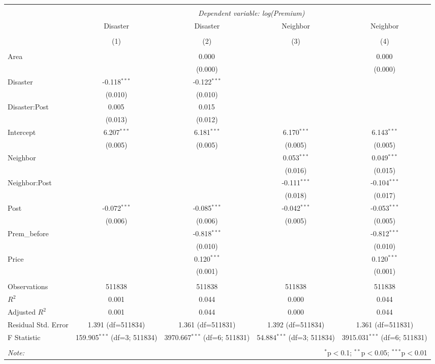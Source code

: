 
\begin{tabular}{@{\extracolsep{5pt}}lcccc}
\\[-1.8ex]\hline
\hline \\[-1.8ex]
& \multicolumn{4}{c}{\textit{Dependent variable: log(Premium)}} \
\cr \cline{2-5}
\\[-1.8ex] & \multicolumn{1}{c}{Disaster} & \multicolumn{1}{c}{Disaster} & \multicolumn{1}{c}{Neighbor} & \multicolumn{1}{c}{Neighbor}  \\
\\[-1.8ex] & (1) & (2) & (3) & (4) \\
\hline \\[-1.8ex]
 Area & & 0.000$^{}$ & & 0.000$^{}$ \\
& & (0.000) & & (0.000) \\
 Disaster & -0.118$^{***}$ & -0.122$^{***}$ & & \\
& (0.010) & (0.010) & & \\
 Disaster:Post & 0.005$^{}$ & 0.015$^{}$ & & \\
& (0.013) & (0.012) & & \\
 Intercept & 6.207$^{***}$ & 6.181$^{***}$ & 6.170$^{***}$ & 6.143$^{***}$ \\
& (0.005) & (0.005) & (0.005) & (0.005) \\
 Neighbor & & & 0.053$^{***}$ & 0.049$^{***}$ \\
& & & (0.016) & (0.015) \\
 Neighbor:Post & & & -0.111$^{***}$ & -0.104$^{***}$ \\
& & & (0.018) & (0.017) \\
 Post & -0.072$^{***}$ & -0.085$^{***}$ & -0.042$^{***}$ & -0.053$^{***}$ \\
& (0.006) & (0.006) & (0.005) & (0.005) \\
 Prem\_before & & -0.818$^{***}$ & & -0.812$^{***}$ \\
& & (0.010) & & (0.010) \\
 Price & & 0.120$^{***}$ & & 0.120$^{***}$ \\
& & (0.001) & & (0.001) \\
\hline \\[-1.8ex]
 Observations & 511838 & 511838 & 511838 & 511838 \\
 $R^2$ & 0.001 & 0.044 & 0.000 & 0.044 \\
 Adjusted $R^2$ & 0.001 & 0.044 & 0.000 & 0.044 \\
 Residual Std. Error & 1.391 (df=511834) & 1.361 (df=511831) & 1.392 (df=511834) & 1.361 (df=511831) \\
 F Statistic & 159.905$^{***}$ (df=3; 511834) & 3970.667$^{***}$ (df=6; 511831) & 54.884$^{***}$ (df=3; 511834) & 3915.031$^{***}$ (df=6; 511831) \\
\hline
\hline \\[-1.8ex]
\textit{Note:} & \multicolumn{4}{r}{$^{*}$p$<$0.1; $^{**}$p$<$0.05; $^{***}$p$<$0.01} \\
\end{tabular}
